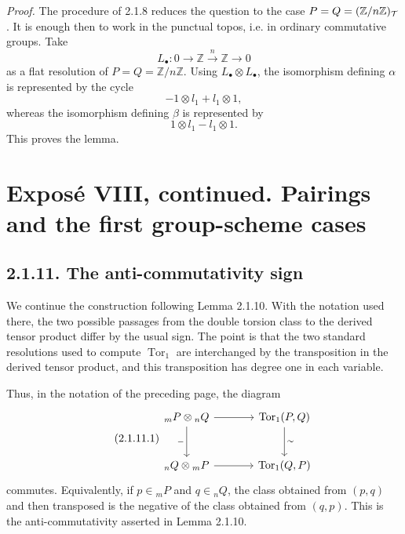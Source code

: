 \documentclass[11pt]{article}
\providecommand{\Tor}{\operatorname{Tor}}
\begin{document}
\emph{Proof.}  The procedure of 2.1.8 reduces the question to the case \(P=Q=(\mathbb Z/n\mathbb Z)_\mathcal T\).  It is enough then to work in the punctual topos, i.e. in ordinary commutative groups.  Take
\[
        L_\bullet:0\longrightarrow\mathbb Z\xrightarrow{n}\mathbb Z\longrightarrow0
\]
as a flat resolution of \(P=Q=\mathbb Z/n\mathbb Z\).  Using \(L_\bullet\otimes L_\bullet\), the isomorphism defining \(\alpha\) is represented by the cycle
\[
        -1\otimes l_1+l_1\otimes1,
\]
whereas the isomorphism defining \(\beta\) is represented by
\[
        1\otimes l_1-l_1\otimes1.
\]
This proves the lemma.



\providecommand{\Biext}{\operatorname{Biext}}
\providecommand{\BIEXT}{\operatorname{BIEXT}}
\providecommand{\AB}{\operatorname{AB}}
\providecommand{\coker}{\operatorname{coker}}
\providecommand{\Coker}{\operatorname{Coker}}
\providecommand{\Homab}{\operatorname{Hom}_{\mathrm{ab}}}
\providecommand{\Homgr}{\operatorname{Hom}_{\mathrm{gr}}}
\providecommand{\Cart}{\operatorname{Cart}}
\providecommand{\Bil}{\operatorname{Bil}}
\providecommand{\tE}{\,{}^{t}\!E}
\providecommand{\G}{\mathcal G}
\providecommand{\T}{\mathcal T}
\providecommand{\Zmod}{\mathbb Z\text{-}\mathrm{Mod}}


\section*{Exposé VIII, continued. Pairings and the first group-scheme cases}

\subsection*{2.1.11. The anti-commutativity sign}

We continue the construction following Lemma 2.1.10.  With the notation used there, the two possible passages from the double torsion class to the derived tensor product differ by the usual sign.  The point is that the two standard resolutions used to compute \(\Tor_1\) are interchanged by the transposition in the derived tensor product, and this transposition has degree one in each variable.

Thus, in the notation of the preceding page, the diagram
\begin{equation}\tag{2.1.11.1}
\begin{tikzcd}[column sep=large,row sep=large]
 {}_mP\otimes {}_nQ \arrow[r] \arrow[d,"-"'] & \Tor_1(P,Q)\arrow[d,"\sim"]\\
 {}_nQ\otimes {}_mP \arrow[r] & \Tor_1(Q,P)
\end{tikzcd}
\end{equation}
commutes.  Equivalently, if \(p\in {}_mP\) and \(q\in {}_nQ\), the class obtained from \((p,q)\) and then transposed is the negative of the class obtained from \((q,p)\).  This is the anti-commutativity asserted in Lemma 2.1.10.
\end{document}
